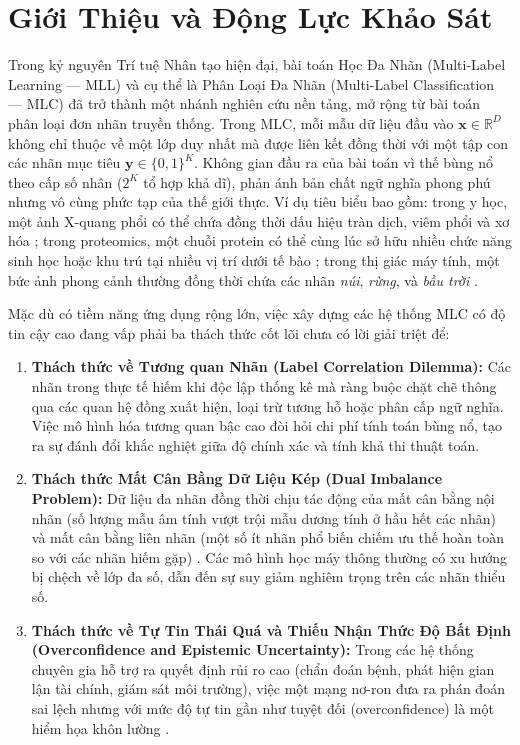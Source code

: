 \documentclass[1p,times]{elsarticle}
\begin{document}
\section{Giới Thiệu và Động Lực Khảo Sát}
\label{sec:intro}

Trong kỷ nguyên Trí tuệ Nhân tạo hiện đại, bài toán Học Đa Nhãn (Multi-Label Learning — MLL) và cụ thể là Phân Loại Đa Nhãn (Multi-Label Classification — MLC) \citep{tsoumakas2007multi, zhang2014review, gibaja2015tutorial} đã trở thành một nhánh nghiên cứu nền tảng, mở rộng từ bài toán phân loại đơn nhãn truyền thống. Trong MLC, mỗi mẫu dữ liệu đầu vào $\mathbf{x} \in \mathbb{R}^D$ không chỉ thuộc về một lớp duy nhất mà được liên kết đồng thời với một tập con các nhãn mục tiêu $\mathbf{y} \in \{0, 1\}^K$. Không gian đầu ra của bài toán vì thế bùng nổ theo cấp số nhân ($2^K$ tổ hợp khả dĩ), phản ánh bản chất ngữ nghĩa phong phú nhưng vô cùng phức tạp của thế giới thực. Ví dụ tiêu biểu bao gồm: trong y học, một ảnh X-quang phổi có thể chứa đồng thời dấu hiệu tràn dịch, viêm phổi và xơ hóa \citep{wang2017chestx}; trong proteomics, một chuỗi protein có thể cùng lúc sở hữu nhiều chức năng sinh học hoặc khu trú tại nhiều vị trí dưới tế bào \citep{chou2011pseacc}; trong thị giác máy tính, một bức ảnh phong cảnh thường đồng thời chứa các nhãn \textit{núi}, \textit{rừng}, và \textit{bầu trời} \citep{boutell2004learning}.

Mặc dù có tiềm năng ứng dụng rộng lớn, việc xây dựng các hệ thống MLC có độ tin cậy cao đang vấp phải ba thách thức cốt lõi chưa có lời giải triệt để:
\begin{enumerate}
    \item \textbf{Thách thức về Tương quan Nhãn (Label Correlation Dilemma):} Các nhãn trong thực tế hiếm khi độc lập thống kê mà ràng buộc chặt chẽ thông qua các quan hệ đồng xuất hiện, loại trừ tương hỗ hoặc phân cấp ngữ nghĩa. Việc mô hình hóa tương quan bậc cao đòi hỏi chi phí tính toán bùng nổ, tạo ra sự đánh đổi khắc nghiệt giữa độ chính xác và tính khả thi thuật toán.
    \item \textbf{Thách thức Mất Cân Bằng Dữ Liệu Kép (Dual Imbalance Problem):} Dữ liệu đa nhãn đồng thời chịu tác động của mất cân bằng nội nhãn (số lượng mẫu âm tính vượt trội mẫu dương tính ở hầu hết các nhãn) và mất cân bằng liên nhãn (một số ít nhãn phổ biến chiếm ưu thế hoàn toàn so với các nhãn hiếm gặp) \citep{charte2015addressing}. Các mô hình học máy thông thường có xu hướng bị chệch về lớp đa số, dẫn đến sự suy giảm nghiêm trọng trên các nhãn thiểu số.
    \item \textbf{Thách thức về Tự Tin Thái Quá và Thiếu Nhận Thức Độ Bất Định (Overconfidence and Epistemic Uncertainty):} Trong các hệ thống chuyên gia hỗ trợ ra quyết định rủi ro cao (chẩn đoán bệnh, phát hiện gian lận tài chính, giám sát môi trường), việc một mạng nơ-ron đưa ra phán đoán sai lệch nhưng với mức độ tự tin gần như tuyệt đối (overconfidence) là một hiểm họa khôn lường \citep{guo2017calibration, hullermeier2021aleatoric}.
\end{enumerate}
\end{document}
